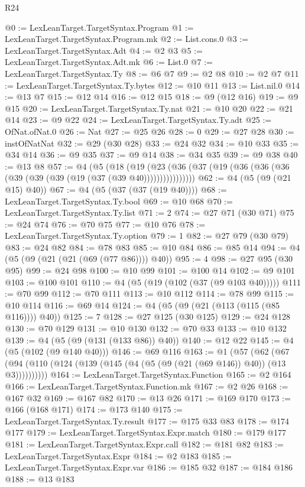 \begin{lexlean}{R24}
\begin{coremodule}
@0 := LexLeanTarget.TargetSyntax.Program
@1 := LexLeanTarget.TargetSyntax.Program.mk
@2 := List.cons.{0}
@3 := LexLeanTarget.TargetSyntax.Adt
@4 := @2 @3
@5 := LexLeanTarget.TargetSyntax.Adt.mk
@6 := List.{0}
@7 := LexLeanTarget.TargetSyntax.Ty
@8 := @6 @7
@9 := @2 @8
@10 := @2 @7
@11 := LexLeanTarget.TargetSyntax.Ty.bytes
@12 := @10 @11
@13 := List.nil.{0}
@14 := @13 @7
@15 := @12 @14
@16 := @12 @15
@18 := @9 (@12 @16)
@19 := @9 @15
@20 := LexLeanTarget.TargetSyntax.Ty.nat
@21 := @10 @20
@22 := @21 @14
@23 := @9 @22
@24 := LexLeanTarget.TargetSyntax.Ty.adt
@25 := OfNat.ofNat.{0}
@26 := Nat
@27 := @25 @26
@28 := 0
@29 := @27 @28
@30 := instOfNatNat
@32 := @29 (@30 @28)
@33 := @24 @32
@34 := @10 @33
@35 := @34 @14
@36 := @9 @35
@37 := @9 @14
@38 := @34 @35
@39 := @9 @38
@40 := @13 @8
@57 := @4
    (@5
      (@18 (@19 (@23 (@36 (@37 (@19 (@36 (@36 (@36 (@39 (@39 (@39 (@19 (@37 (@39 @40))))))))))))))))
@62 := @4 (@5 (@9 (@21 @15) @40))
@67 := @4 (@5 (@37 (@37 (@19 @40))))
@68 := LexLeanTarget.TargetSyntax.Ty.bool
@69 := @10 @68
@70 := LexLeanTarget.TargetSyntax.Ty.list
@71 := 2
@74 := @27 @71 (@30 @71)
@75 := @24 @74
@76 := @70 @75
@77 := @10 @76
@78 := LexLeanTarget.TargetSyntax.Ty.option
@79 := 1
@82 := @27 @79 (@30 @79)
@83 := @24 @82
@84 := @78 @83
@85 := @10 @84
@86 := @85 @14
@94 := @4 (@5 (@9 (@21 (@21 (@69 (@77 @86)))) @40))
@95 := 4
@98 := @27 @95 (@30 @95)
@99 := @24 @98
@100 := @10 @99
@101 := @100 @14
@102 := @9 @101
@103 := @100 @101
@110 := @4 (@5 (@19 (@102 (@37 (@9 @103 @40)))))
@111 := @70 @99
@112 := @70 @111
@113 := @10 @112
@114 := @78 @99
@115 := @10 @114
@116 := @69 @14
@124 := @4 (@5 (@9 (@21 (@113 (@115 (@85 @116)))) @40))
@125 := 7
@128 := @27 @125 (@30 @125)
@129 := @24 @128
@130 := @70 @129
@131 := @10 @130
@132 := @70 @33
@133 := @10 @132
@139 := @4 (@5 (@9 (@131 (@133 @86)) @40))
@140 := @12 @22
@145 := @4 (@5 (@102 (@9 @140 @40)))
@146 := @69 @116
@163 := @1
    (@57 (@62 (@67 (@94 (@110 (@124 (@139 (@145 (@4 (@5 (@9 (@21 (@69 @146)) @40)) (@13 @3))))))))))
@164 := LexLeanTarget.TargetSyntax.Function
@165 := @2 @164
@166 := LexLeanTarget.TargetSyntax.Function.mk
@167 := @2 @26
@168 := @167 @32
@169 := @167 @82
@170 := @13 @26
@171 := @169 @170
@173 := @166 (@168 @171)
@174 := @173 @140
@175 := LexLeanTarget.TargetSyntax.Ty.result
@177 := @175 @33 @83
@178 := @174 @177
@179 := LexLeanTarget.TargetSyntax.Expr.match
@180 := @179 @177
@181 := LexLeanTarget.TargetSyntax.Expr.call
@182 := @181 @82
@183 := LexLeanTarget.TargetSyntax.Expr
@184 := @2 @183
@185 := LexLeanTarget.TargetSyntax.Expr.var
@186 := @185 @32
@187 := @184 @186
@188 := @13 @183

\end{coremodule}
\end{lexlean}
